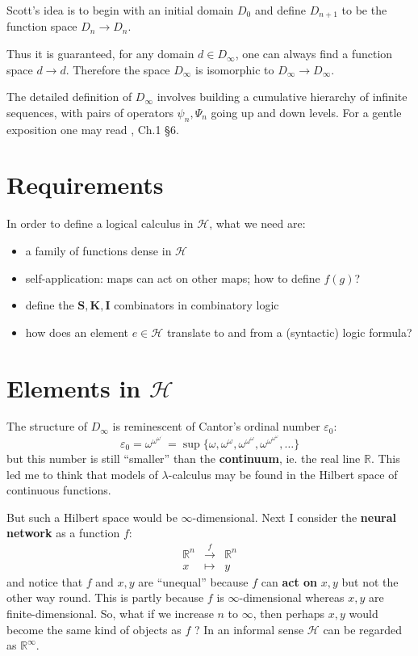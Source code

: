 Scott's idea is to begin with an initial domain $D_0$ and define $D_{n+1}$ to be the function space $D_n \rightarrow D_n$.

Thus it is guaranteed, for any domain $d \in D_{\infty}$, one can always find a function space $d \rightarrow d$.  Therefore the space $D_{\infty}$ is isomorphic to $ D_{\infty} \rightarrow D_{\infty}$.

The detailed definition of $D_{\infty}$ involves building a cumulative hierarchy of infinite sequences, with pairs of operators $\psi_n, \Psi_n$ going up and down levels.  For a gentle exposition one may read \parencite{Stenlund1972}, Ch.1 \S6.

\section{Requirements}

In order to define a logical calculus in $\mathcal{H}$, what we need are:
\begin{itemize}
	\item a family of functions dense in $\mathcal{H}$
	\item self-application:  maps can act on other maps; how to define $f(g)$?
	\item define the $\mathbf{S}, \mathbf{K}, \mathbf{I}$ combinators in combinatory logic
 	\item how does an element $e \in \mathcal{H}$ translate to and from a (syntactic) logic formula?
\end{itemize}

\section{Elements in $\mathcal{H}$}

The structure of $D_{\infty}$ is reminescent of Cantor's ordinal number $\varepsilon_0$:
\begin{equation}
{\displaystyle \varepsilon _{0}=\omega ^{\omega ^{\omega ^{\cdot ^{\cdot ^{\cdot }}}}}=\sup\{\omega ,\omega ^{\omega },\omega ^{\omega ^{\omega }},\omega ^{\omega ^{\omega ^{\omega }}},\dots \}}
\end{equation}
but this number is still ``smaller'' than the \textbf{continuum}, ie. the real line $\mathbb{R}$.  This led me to think that models of $\lambda$-calculus may be found in the Hilbert space of continuous functions.

But such a Hilbert space would be $\infty$-dimensional.  Next I consider the \textbf{neural network} as a function $f$:
\begin{eqnarray}
\mathbb{R}^n & \stackrel{f}{\longrightarrow} & \mathbb{R}^n \\
x & \mapsto & y \nonumber
\end{eqnarray}
and notice that $f$ and $x, y$ are ``unequal'' because $f$ can \textbf{act on} $x, y$ but not the other way round.  This is partly because $f$ is $\infty$-dimensional whereas $x, y$ are finite-dimensional.  So, what if we increase $n$ to $\infty$, then perhaps $x, y$ would become the same kind of objects as $f$ ?  In an informal sense $\mathcal{H}$ can be regarded as $\mathbb{R}^{\infty}$.

